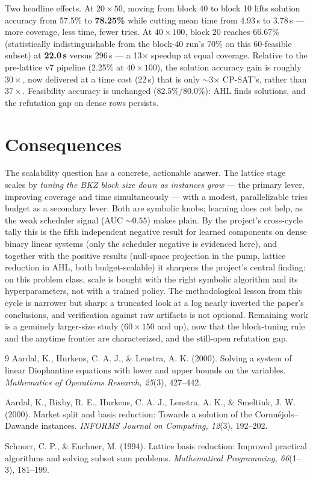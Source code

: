 \documentclass[12pt]{article}
\begin{document}
Two headline effects. At $20 \times 50$, moving from block 40 to block 10 lifts solution accuracy from 57.5\% to \textbf{78.25\%} while cutting mean time from 4.93\,s to 3.78\,s --- more coverage, less time, fewer tries. At $40 \times 100$, block 20 reaches 66.67\% (statistically indistinguishable from the block-40 run's 70\% on this 60-feasible subset) at \textbf{22.0\,s} versus 296\,s --- a 13$\times$ speedup at equal coverage. Relative to the pre-lattice v7 pipeline (2.25\% at $40\times100$), the solution accuracy gain is roughly $30\times$, now delivered at a time cost (22\,s) that is only $\sim$3$\times$ CP-SAT's, rather than $37\times$. Feasibility accuracy is unchanged ($82.5\%$/$80.0\%$): AHL finds solutions, and the refutation gap on dense rows persists.

\section{Consequences}

The scalability question has a concrete, actionable answer. The lattice stage scales by \emph{tuning the BKZ block size down as instances grow} --- the primary lever, improving coverage and time simultaneously --- with a modest, parallelizable tries budget as a secondary lever. Both are symbolic knobs; learning does not help, as the weak scheduler signal (AUC $\sim0.55$) makes plain. By the project's cross-cycle tally this is the fifth independent negative result for learned components on dense binary linear systems (only the scheduler negative is evidenced here), and together with the positive results (null-space projection in the pump, lattice reduction in AHL, both budget-scalable) it sharpens the project's central finding: on this problem class, scale is bought with the right symbolic algorithm and its hyperparameters, not with a trained policy. The methodological lesson from this cycle is narrower but sharp: a truncated look at a log nearly inverted the paper's conclusions, and verification against raw artifacts is not optional. Remaining work is a genuinely larger-size study ($60 \times 150$ and up), now that the block-tuning rule and the anytime frontier are characterized, and the still-open refutation gap.

\begin{thebibliography}{9}
Aardal, K., Hurkens, C. A. J., \& Lenstra, A. K. (2000). Solving a system of linear Diophantine equations with lower and upper bounds on the variables. \emph{Mathematics of Operations Research, 25}(3), 427--442.

Aardal, K., Bixby, R. E., Hurkens, C. A. J., Lenstra, A. K., \& Smeltink, J. W. (2000). Market split and basis reduction: Towards a solution of the Cornu\'ejols--Dawande instances. \emph{INFORMS Journal on Computing, 12}(3), 192--202.

Schnorr, C. P., \& Euchner, M. (1994). Lattice basis reduction: Improved practical algorithms and solving subset sum problems. \emph{Mathematical Programming, 66}(1--3), 181--199.
\end{thebibliography}
\end{document}
